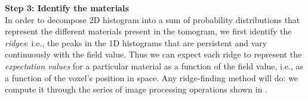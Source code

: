 \vspace{\baselineskip}
\noindent\textbf{Step 3: Identify the materials} \\
In order to decompose 2D histogram into a sum of probability distributions that represent
the different materials present in the tomogram, we first identify the {\em ridges}:
i.e., the peaks in the 1D histograms that are persistent and vary continuously with the field value.
Thus we can expect each ridge to represent the {\em expectation values} for a particular material
as a function of the field value, i.e., as a function of the voxel's position in space.
%
Any ridge-finding method will do: we compute it through the series of image processing operations shown in
.



